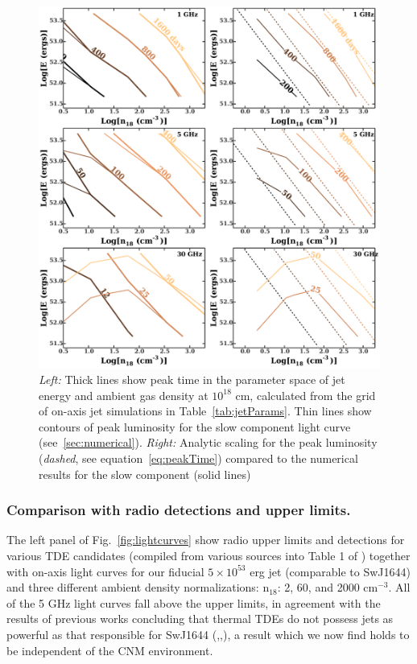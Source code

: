 \documentclass[usenatbib,fleqn]{mnras}
\begin{document}
\begin{figure}
  \includegraphics[width=16cm]{tp_contours_new.pdf}
  \caption{\label{fig:ContoursTp} {\it {Left:}} Thick lines show peak
    time in the parameter space of jet energy and ambient gas density
    at $10^{18}$ cm, calculated from the grid of on-axis jet
    simulations in Table~\ref{tab:jetParams}. Thin lines show contours
    of peak luminosity for the slow component light curve
    (see~\ref{sec:numerical}). {\it Right:} Analytic scaling for the
    peak luminosity ({\it dashed}, see equation~\ref{eq:peakTime})
    compared to the numerical results for the slow component (solid
    lines)}
\end{figure}

\subsubsection{Comparison with radio detections and upper limits.}
\label{sec:upLims}
The left panel of Fig.~\ref{fig:lightcurves} show radio upper limits
and detections for various TDE candidates (compiled from various
sources into Table 1 of \citealt{Mimica+2015}) together with on-axis
light curves for our fiducial $5\times 10^{53}$ erg jet (comparable to
SwJ1644) and three different ambient density normalizations: n$_{18}$:
2, 60, and 2000 cm$^{-3}$. All of the 5 GHz light curves fall above
the upper limits, in agreement with the results of previous works
concluding that thermal TDEs do not possess jets as powerful as that
responsible for SwJ1644
(\citealt{Bower+2013},\citealt{van-Velzen+2013},\citealt{Mimica+2015}),
a result which we now find holds to be independent of the CNM
environment.
\end{document}
